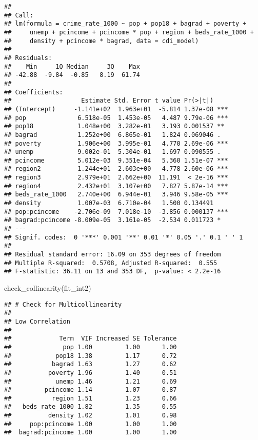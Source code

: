 \documentclass[
  11pt,
]{article}
\newenvironment{Shaded}{\begin{snugshade}}{\end{snugshade}}
\newcommand{\FunctionTok}[1]{\textcolor[rgb]{0.00,0.00,0.00}{#1}}
\newcommand{\NormalTok}[1]{#1}
\begin{document}
\begin{verbatim}
## 
## Call:
## lm(formula = crime_rate_1000 ~ pop + pop18 + bagrad + poverty + 
##     unemp + pcincome + pcincome * pop + region + beds_rate_1000 + 
##     density + pcincome * bagrad, data = cdi_model)
## 
## Residuals:
##    Min     1Q Median     3Q    Max 
## -42.88  -9.84  -0.85   8.19  61.74 
## 
## Coefficients:
##                   Estimate Std. Error t value Pr(>|t|)    
## (Intercept)     -1.141e+02  1.963e+01  -5.814 1.37e-08 ***
## pop              6.518e-05  1.453e-05   4.487 9.79e-06 ***
## pop18            1.048e+00  3.282e-01   3.193 0.001537 ** 
## bagrad           1.252e+00  6.865e-01   1.824 0.069046 .  
## poverty          1.906e+00  3.995e-01   4.770 2.69e-06 ***
## unemp            9.002e-01  5.304e-01   1.697 0.090555 .  
## pcincome         5.012e-03  9.351e-04   5.360 1.51e-07 ***
## region2          1.244e+01  2.603e+00   4.778 2.60e-06 ***
## region3          2.979e+01  2.662e+00  11.191  < 2e-16 ***
## region4          2.432e+01  3.107e+00   7.827 5.87e-14 ***
## beds_rate_1000   2.740e+00  6.944e-01   3.946 9.58e-05 ***
## density          1.007e-03  6.710e-04   1.500 0.134491    
## pop:pcincome    -2.706e-09  7.018e-10  -3.856 0.000137 ***
## bagrad:pcincome -8.009e-05  3.161e-05  -2.534 0.011723 *  
## ---
## Signif. codes:  0 '***' 0.001 '**' 0.01 '*' 0.05 '.' 0.1 ' ' 1
## 
## Residual standard error: 16.09 on 353 degrees of freedom
## Multiple R-squared:  0.5708, Adjusted R-squared:  0.555 
## F-statistic: 36.11 on 13 and 353 DF,  p-value: < 2.2e-16
\end{verbatim}

\begin{Shaded}
\begin{Highlighting}[]
\FunctionTok{check\_collinearity}\NormalTok{(fit\_int2)}
\end{Highlighting}
\end{Shaded}

\begin{verbatim}
## # Check for Multicollinearity
## 
## Low Correlation
## 
##             Term  VIF Increased SE Tolerance
##              pop 1.00         1.00      1.00
##            pop18 1.38         1.17      0.72
##           bagrad 1.63         1.27      0.62
##          poverty 1.96         1.40      0.51
##            unemp 1.46         1.21      0.69
##         pcincome 1.14         1.07      0.87
##           region 1.51         1.23      0.66
##   beds_rate_1000 1.82         1.35      0.55
##          density 1.02         1.01      0.98
##     pop:pcincome 1.00         1.00      1.00
##  bagrad:pcincome 1.00         1.00      1.00
\end{verbatim}
\end{document}
